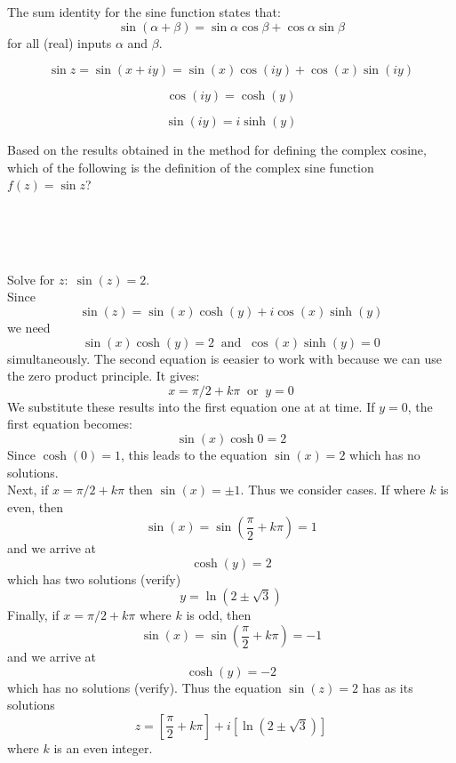 \documentclass[handout]{ximera}
\begin{document}
\begin{question}
The sum identity for the sine function states that:
\[
\sin(\alpha + \beta) = \sin \alpha \cos \beta + \cos \alpha \sin \beta
\]
for all (real) inputs $\alpha$ and $\beta$.

\begin{hint}
\[
\sin{z} = \sin(x+iy) = \sin(x) \cos(iy) + \cos(x) \sin(iy)
\]
\end{hint}
\begin{hint}
\[
 \cos(iy) = \cosh(y)
\]
\end{hint}
\begin{hint}
\[
\sin(iy) = i \sinh(y)
\]
\end{hint}


Based on the results obtained in the method for defining the complex cosine, which of the following is the definition 
of the complex sine function $f(z) = \sin z$?
\begin{multipleChoice}
\\
\\
\\
\end{multipleChoice}
\end{question}


\begin{example}[example 1]
Solve for $z: \; \sin(z) = 2$.\\
Since
\[
\sin(z) = \sin(x) \cosh(y) + i\cos(x) \sinh(y)
\]
we need 
\[
\sin(x) \cosh(y) =2 \;\; \mbox{and} \;\; \cos(x) \sinh(y) = 0
\]
simultaneously. The second equation is eeasier to work with because we can use the zero product principle. 
It gives:
\[
x = \pi/2 + k\pi \;\; \mbox{or} \;\; y = 0
\]
We substitute these results into the first equation one at at time. If $y = 0$, the first equation becomes:
\[
\sin(x)\cosh 0 = 2
\]
Since $\cosh(0) = 1$, this leads to the equation $\sin(x) = 2$ which has no solutions.\\
Next, if $x = \pi/2 + k\pi$ then $\sin(x) = \pm 1$. Thus we consider cases. If where $k$ is even, then 
\[
\sin(x) = \sin\left(\frac{\pi}{2} + k\pi\right) = 1
\]
and we arrive at 
\[
\cosh(y) = 2
\]
which has two solutions (verify)
\[
y = \ln\left(2\pm \sqrt 3 \right)
\]
Finally, if $x = \pi/2 + k\pi$ where $k$ is odd, then 
\[
\sin(x) = \sin\left(\frac{\pi}{2} + k\pi\right) = -1
\]
and we arrive at 
\[
\cosh(y) = -2
\]
which has no solutions (verify).
Thus the equation $\sin(z) = 2$ has as its solutions
\[
z = \left[\frac{\pi}{2} + k\pi\right] + i\left[\ln\left(2\pm \sqrt 3\right)\right]
\]
where $k$ is an even integer.
\end{example}
\end{document}
